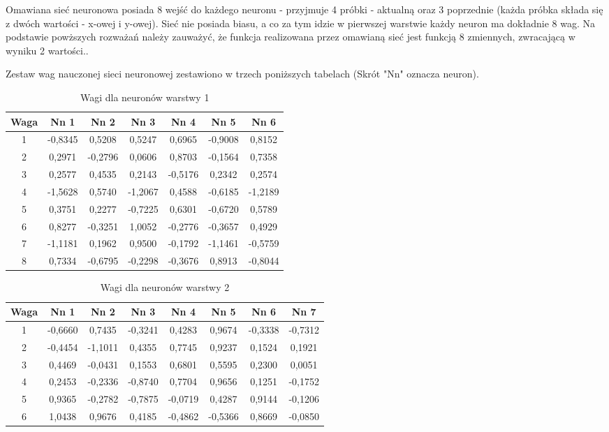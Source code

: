 \documentclass{classrep}
\begin{document}
Omawiana sieć neuronowa posiada 8 wejść do każdego neuronu - przyjmuje 4 próbki - aktualną oraz 3 poprzednie (każda próbka składa się z dwóch wartości - x-owej i y-owej). Sieć nie posiada biasu, a co za tym idzie w pierwszej warstwie każdy neuron ma  dokładnie 8 wag. Na podstawie powższych rozważań należy zauważyć, że funkcja realizowana przez omawianą sieć jest funkcją 8 zmiennych, zwracającą w wyniku 2 wartości.\newline.

Zestaw wag nauczonej sieci neuronowej zestawiono w trzech poniższych tabelach (Skrót "Nn" oznacza neuron). 

\begin{table}[H]
	\centering
	\begin{tabular}{c c c c c c c} 
		\hline
		\textbf{Waga} & \textbf{Nn 1} & \textbf{Nn 2} & \textbf{Nn 3} & \textbf{Nn 4} & \textbf{Nn 5} & \textbf{Nn 6}\\ [0.5ex] 
		\hline
		\hline 
1	&	-0,8345	&	0,5208	&	0,5247	&	0,6965	&	-0,9008	&	0,8152	\\
2	&	0,2971	&	-0,2796	&	0,0606	&	0,8703	&	-0,1564	&	0,7358	\\
3	&	0,2577	&	0,4535	&	0,2143	&	-0,5176	&	0,2342	&	0,2574	\\
4	&	-1,5628	&	0,5740	&	-1,2067	&	0,4588	&	-0,6185	&	-1,2189	\\
5	&	0,3751	&	0,2277	&	-0,7225	&	0,6301	&	-0,6720	&	0,5789	\\
6	&	0,8277	&	-0,3251	&	1,0052	&	-0,2776	&	-0,3657	&	0,4929	\\
7	&	-1,1181	&	0,1962	&	0,9500	&	-0,1792	&	-1,1461	&	-0,5759	\\
8	&	0,7334	&	-0,6795	&	-0,2298	&	-0,3676	&	0,8913	&	-0,8044	\\
		\hline
	\end{tabular}
	\caption{Wagi dla neuronów warstwy 1}
\end{table}

\begin{table}[H]
	\centering
	\begin{tabular}{c c c c c c c c} 
		\hline
		\textbf{Waga} & \textbf{Nn 1} & \textbf{Nn 2} & \textbf{Nn 3} & \textbf{Nn 4} & \textbf{Nn 5} & \textbf{Nn 6} & \textbf{Nn 7}\\ [0.5ex] 
		\hline
		\hline 
1	&	-0,6660	&	0,7435	&	-0,3241	&	0,4283	&	0,9674	&	-0,3338	&	-0,7312	\\
2	&	-0,4454	&	-1,1011	&	0,4355	&	0,7745	&	0,9237	&	0,1524	&	0,1921	\\
3	&	0,4469	&	-0,0431	&	0,1553	&	0,6801	&	0,5595	&	0,2300	&	0,0051	\\
4	&	0,2453	&	-0,2336	&	-0,8740	&	0,7704	&	0,9656	&	0,1251	&	-0,1752	\\
5	&	0,9365	&	-0,2782	&	-0,7875	&	-0,0719	&	0,4287	&	0,9144	&	-0,1206	\\
6	&	1,0438	&	0,9676	&	0,4185	&	-0,4862	&	-0,5366	&	0,8669	&	-0,0850	\\
		\hline
	\end{tabular}
	\caption{Wagi dla neuronów warstwy 2}
\end{table}
\end{document}
